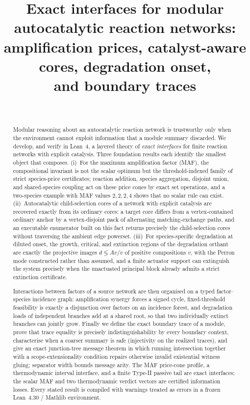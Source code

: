 \documentclass[11pt,a4paper]{article}
\title{Exact interfaces for modular autocatalytic reaction networks:\\
amplification prices, catalyst-aware cores, degradation onset,\\ and boundary traces}
\author{\PaperAuthor\\ \PaperAffiliation}
\date{\PaperDate}
\theoremstyle{plain}
\theoremstyle{definition}
\theoremstyle{remark}
\begin{document}
\maketitle

\begin{abstract}
Modular reasoning about an autocatalytic reaction network is trustworthy only when the environment cannot exploit information that a module summary discarded. We develop, and verify in Lean~4, a layered theory of \emph{exact interfaces} for finite reaction networks with explicit catalysis. Three foundation results each identify the smallest object that composes. (i)~For the maximum amplification factor (MAF), the compositional invariant is not the scalar optimum but the threshold-indexed family of strict species-price certificates; reaction addition, species aggregation, disjoint union, and shared-species coupling act on these price cones by exact set operations, and a two-species example with MAF values $2,2,2,4$ shows that no scalar rule can exist. (ii)~Autocatalytic child-selection cores of a network with explicit catalysis are recovered exactly from its ordinary cores: a target core differs from a vertex-contained ordinary anchor by a vertex-disjoint pack of alternating matching-exchange paths, and an executable enumerator built on this fact returns precisely the child-selection cores without traversing the ambient edge powerset. (iii)~For species-specific degradation at diluted onset, the growth, critical, and extinction regions of the degradation orthant are exactly the projective images $d\lessgtr Av/v$ of positive compositions $v$, with the Perron mode constructed rather than assumed, and a finite actuator support can extinguish the system precisely when the unactuated principal block already admits a strict extinction certificate.

Interactions between factors of a source network are then organised on a typed factor--species incidence graph: amplification synergy forces a signed cycle, fixed-threshold feasibility is exactly a disjunction over factors on an incidence forest, and degradation loads of independent branches add at a shared root, so that two individually extinct branches can jointly grow. Finally we define the exact boundary trace of a module, prove that trace equality is precisely indistinguishability by every boundary context, characterise when a coarser summary is safe (injectivity on the realized traces), and give an exact junction-tree message theorem in which running intersection together with a scope-extensionality condition repairs otherwise invalid existential witness gluing; separator width bounds message arity. The MAF price-cone profile, a thermodynamic interval interface, and a finite Type-II passive tail are exact interfaces; the scalar MAF and two thermodynamic verdict vectors are certified information losses. Every stated result is compiled with warnings treated as errors in a frozen Lean~4.30 / Mathlib environment.
\end{abstract}
\end{document}
